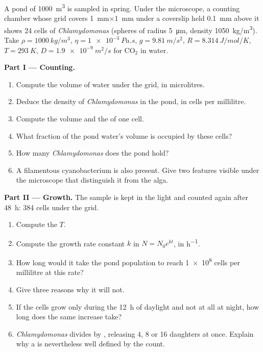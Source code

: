 \begin{problem}
\label{pb:b2:unicellular-diversity:1}
A pond of \qty{1000}{m^3} is sampled in spring. Under the microscope,
a counting chamber whose grid covers \qty{1}{mm}$\times$\qty{1}{mm}
under a coverslip held \qty{0.1}{mm} above it shows 24 cells of
\emph{Chlamydomonas} (spheres of radius \qty{5}{\micro m},
density \qty{1050}{kg/m^3}). Take $\rho = \qty{1000}{kg/m^3}$,
$\eta = \qty{1e-3}{Pa.s}$, $g = \qty{9.81}{m/s^2}$, $R =
\qty{8.314}{J/mol/K}$, $T = \qty{293}{K}$, $D = \qty{1.9e-9}{m^2/s}$
for $\mathrm{CO_2}$ in water.

\medskip
\noindent\textbf{Part I --- Counting.}
\begin{enumerate}
  \item Compute the volume of water under the grid, in microlitres.
  \item Deduce the density of \emph{Chlamydomonas} in the pond, in
        cells per millilitre.
  \item Compute the volume and the  of one
        cell.
  \item What fraction of the pond water's volume is occupied by these
        cells?
  \item How many \emph{Chlamydomonas} does the pond hold?
  \item A filamentous cyanobacterium is also present. Give two
        features visible under the microscope that distinguish it
        from the alga.
\end{enumerate}

\medskip
\noindent\textbf{Part II --- Growth.}
The sample is kept in the light and counted again after \qty{48}{h}:
\num{384} cells under the grid.
\begin{enumerate}[resume]
  \item Compute the  $T$.
  \item Compute the growth rate constant $k$ in $N = N_0 e^{kt}$, in
        \unit{h^{-1}}.
  \item How long would it take the pond population to reach
        \qty{1e8}{} cells per millilitre at this rate?
  \item Give three reasons why it will not.
  \item If the cells grow only during the \qty{12}{h} of daylight and
        not at all at night, how long does the same increase take?
  \item \emph{Chlamydomonas} divides by , releasing
        4, 8 or 16 daughters at once. Explain why a 
        is nevertheless well defined by the count.
\end{enumerate}


\end{problem}
